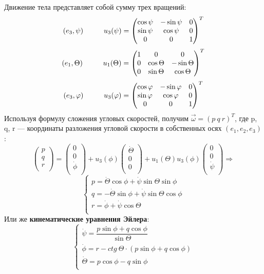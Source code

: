 Движение тела представляет собой сумму трех вращений:
\[
(e_3, \psi) \hspace*{1cm} u_3(\psi) = \begin{pmatrix}
    \cos{\psi} & -\sin{\psi} & 0 \\
    \sin{\psi} & \cos{\psi} & 0 \\
    0 & 0 & 1\\
\end{pmatrix}^T
\]
\[
(e_1, \Theta) \hspace*{1cm} u_1(\Theta) = \begin{pmatrix}
    1 & 0 & 0\\
    0 & \cos{\Theta} & -\sin{\Theta}\\
    0 & \sin{\Theta} & \cos{\Theta}\\
\end{pmatrix}^T
\]
\[
(e_3, \varphi) \hspace*{1cm} u_3(\varphi) = \begin{pmatrix}
    \cos{\ensuremath{\varphi}} & -\sin{\ensuremath{\varphi}} & 0 \\
    \sin{\ensuremath{\varphi}} & \cos{\ensuremath{\varphi}} & 0 \\
    0 & 0 & 1\\
\end{pmatrix}^T
\]
Используя формулу сложения угловых скоростей, получим $\vec{\omega} = (p~q~r)^T$, где p, q, r --- координаты разложения угловой скорости в собственных осях $(e_1, e_2, e_3)$: 
\[
\begin{pmatrix}
    p\\
    q\\
    r\\
\end{pmatrix} = \begin{pmatrix}
    0\\
    0\\
    \dot{\phi}\\ 
\end{pmatrix} + u_3(\phi)\begin{pmatrix}
    \dot{\Theta}\\
    0\\
    0\\
\end{pmatrix} + u_1(\Theta) u_3(\phi)\begin{pmatrix}
    0\\
    0\\
    \dot{\psi}\\
\end{pmatrix} \Longrightarrow
\]
\[
\begin{cases}
    p = \dot{\Theta} \cos{\phi} + \dot{\psi}\sin{\Theta}\sin{\phi}\\
    q = -\dot{\Theta} \sin{\phi} + \dot{\psi}\sin{\Theta}\cos{\phi}\\
    r = \dot{\phi} + \dot{\psi}\cos{\Theta}\\
\end{cases}
\]
\hypertarget{kinematic_Euler_equations}{}
Или же \textbf{кинематические уравнения Эйлера}:
\[
\begin{cases}
    \dot{\psi} = \dfrac{p \sin{\phi} + q \cos{\phi}}{\sin{\Theta}}\\
    \dot{\phi} = r - ctg~{\Theta} \cdot (p \sin{\phi} + q \cos{\phi})\\
    \dot{\Theta} = p \cos{\phi} - q \sin{\phi}\\
\end{cases}
\]



